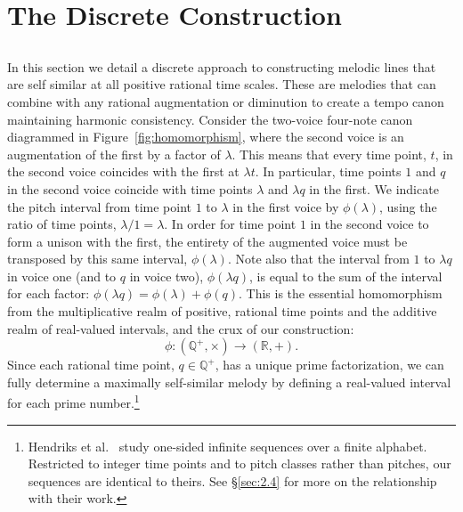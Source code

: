 \documentclass[11pt]{article}
\theoremstyle{plain}
\theoremstyle{definition}
\theoremstyle{remark}
\begin{document}
\section{The Discrete Construction}
\label{sec:discrete}

\subsection{}
\label{sec:2.1}

In this section we detail a discrete approach to constructing melodic lines that are self similar at all positive rational time scales. These are melodies that can combine with any rational augmentation or diminution to create a tempo canon maintaining harmonic consistency. Consider the two-voice four-note canon diagrammed in Figure~\ref{fig:homomorphism}, where the second voice is an augmentation of the first by a factor of $\lambda$. This means that every time point, $t$, in the second voice coincides with the first at $\lambda t$. In particular, time points $1$ and $q$ in the second voice coincide with time points $\lambda$ and $\lambda q$ in the first. We indicate the pitch interval from time point $1$ to $\lambda$ in the first voice by $\phi(\lambda)$, using the ratio of time points, $\lambda / 1 = \lambda$. In order for time point $1$ in the second voice to form a unison with the first, the entirety of the augmented voice must be transposed by this same interval, $\phi(\lambda)$. Note also that the interval from $1$ to $\lambda q$ in voice one (and to $q$ in voice two), $\phi(\lambda q)$, is equal to the sum of the interval for each factor: $\phi(\lambda q) = \phi(\lambda) + \phi(q)$. This is the essential homomorphism from the multiplicative realm of positive, rational time points and the additive realm of real-valued intervals, and the crux of our construction:
\begin{equation}
  \phi \colon (\mathbb{Q}^{+}, \times) \longrightarrow (\mathbb{R}, +).
  \label{eq:hom}
\end{equation}
Since each rational time point, $q \in \mathbb{Q}^{+}$, has a unique prime factorization, we can fully determine a maximally self-similar melody by defining a real-valued interval for each prime number.\footnote{Hendriks et al.~\cite{hendriks2012} study one-sided infinite sequences over a finite alphabet. Restricted to integer time points and to pitch classes rather than pitches, our sequences are identical to theirs. See \S\ref{sec:2.4} for more on the relationship with their work.}
\end{document}
